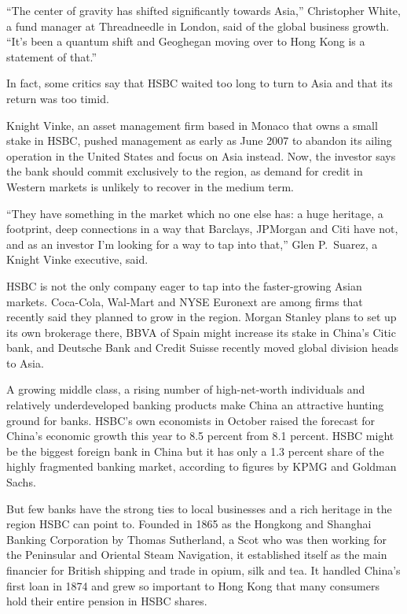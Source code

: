 ﻿\documentclass[12pt]{article}
\begin{document}
``The center of gravity has shifted significantly towards Asia,'' Christopher White, a fund manager
at Threadneedle in London, said of the global business growth. ``It's been a quantum shift and
Geoghegan moving over to Hong Kong is a statement of that.''

In fact, some critics say that HSBC waited too long to turn to Asia and that its return was too
timid\cite{timid}.

Knight Vinke, an asset management firm based in Monaco that owns a small stake in HSBC, pushed
management as early as June 2007 to abandon its ailing operation in the United States and focus on
Asia instead. Now, the investor says the bank should commit exclusively to the region, as demand for
credit in Western markets is unlikely to recover in the medium term.

``They have something in the market which no one else has: a huge heritage, a footprint, deep
connections in a way that Barclays, JPMorgan and Citi have not, and as an investor I'm looking for a
way to tap into that,'' Glen P.~Suarez, a Knight Vinke executive, said.

HSBC is not the only company eager to tap into the faster-growing Asian markets. Coca-Cola, Wal-Mart
and NYSE Euronext are among firms that recently said they planned to grow in the region. Morgan
Stanley plans to set up its own brokerage there, BBVA of Spain might increase its stake in China's
Citic bank, and Deutsche Bank and Credit Suisse recently moved global division heads to Asia.

A growing middle class, a rising number of high-net-worth individuals and relatively underdeveloped
banking products make China an attractive hunting ground for banks. HSBC's own economists in October
raised the forecast for China's economic growth this year to 8.5 percent from 8.1 percent. HSBC
might be the biggest foreign bank in China but it has only a 1.3 percent share of the highly
fragmented banking market, according to figures by KPMG and Goldman Sachs.

But few banks have the strong ties to local businesses and a rich heritage in the region HSBC can
point to. Founded in 1865 as the Hongkong and Shanghai Banking Corporation by Thomas Sutherland, a
Scot who was then working for the Peninsular and Oriental Steam Navigation, it established itself as
the main financier for British shipping and trade in opium, silk and tea. It handled China's first
loan in 1874 and grew so important to Hong Kong that many consumers hold their entire pension in
HSBC shares.
\end{document}
